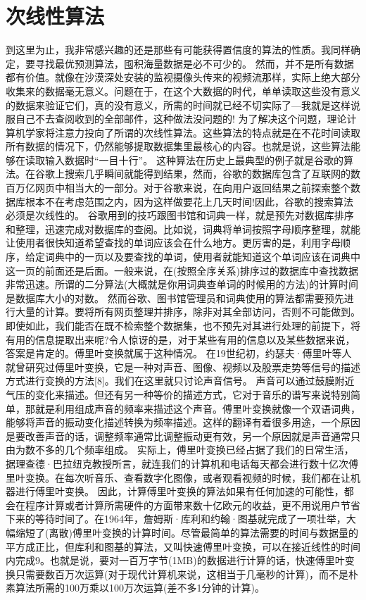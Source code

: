\section{ 次线性算法} 
到这里为止，我非常感兴趣的还是那些有可能获得置信度的算法的性质。我同样确定，要寻找最优预测算法，囤积海量数据是必不可少的。
然而，并不是所有数据都有价值。就像在沙漠深处安装的监视摄像头传来的视频流那样，实际上绝大部分收集来的数据毫无意义。问题在于，在这个大数据的时代，单单读取这些没有意义的数据来验证它们，真的没有意义，所需的时间就已经不切实际了---我就是这样说服自己不去查阅收到的全部邮件，这种做法没问题的!
为了解决这个问题，理论计算机学家将注意力投向了所谓的次线性算法。这些算法的特点就是在不花时间读取所有数据的情况下，仍然能够提取数据集里最核心的内容。也就是说，这些算法能够在读取输入数据时“一目十行”。
这种算法在历史上最典型的例子就是谷歌的算法。在谷歌上搜索几乎瞬间就能得到结果，然而，谷歌的数据库包含了互联网的数百万亿网页中相当大的一部分。对于谷歌来说，在向用户返回结果之前探索整个数据库根本不在考虑范围之内，因为这样做要花上几天时间!因此，谷歌的搜索算法必须是次线性的。
谷歌用到的技巧跟图书馆和词典一样，就是预先对数据库排序和整理，迅速完成对数据库的查阅。比如说，词典将单词按照字母顺序整理，就能让使用者很快知道希望查找的单词应该会在什么地方。更厉害的是，利用字母顺序，给定词典中的一页以及要查找的单词，使用者就能知道这个单词应该在词典中这一页的前面还是后面。一般来说，在(按照全序关系)排序过的数据库中查找数据非常迅速。所谓的二分算法(大概就是你用词典查单词的时候用的方法)的计算时间是数据库大小的对数。
然而谷歌、图书馆管理员和词典使用的算法都需要预先进行大量的计算。要将所有网页整理并排序，除非对其全部访问，否则不可能做到。即使如此，我们能否在既不检索整个数据集，也不预先对其进行处理的前提下，将有用的信息提取出来呢?令人惊讶的是，对于某些有用的信息以及某些数据来说，答案是肯定的。傅里叶变换就属于这种情况。
在19世纪初，约瑟夫·傅里叶等人就曾研究过傅里叶变换，它是一种对声音、图像、视频以及股票走势等信号的描述方式进行变换的方法[8]。我们在这里就只讨论声音信号。
声音可以通过鼓膜附近气压的变化来描述。但还有另一种等价的描述方式，它对于音乐的谱写来说特别简单，那就是利用组成声音的频率来描述这个声音。傅里叶变换就像一个双语词典，能够将声音的振动变化描述转换为频率描述。这样的翻译有着很多用途，一个原因是要改善声音的话，调整频率通常比调整振动更有效，另一个原因就是声音通常只由为数不多的几个频率组成。
实际上，傅里叶变换已经占据了我们的日常生活，据理查德·巴拉纽克教授所言，就连我们的计算机和电话每天都会进行数十亿次傅里叶变换。在每次听音乐、查看数字化图像，或者观看视频的时候，我们都在让机器进行傅里叶变换。
因此，计算傅里叶变换的算法如果有任何加速的可能性，都会在程序计算或者计算所需硬件的方面带来数十亿欧元的收益，更不用说用户节省下来的等待时间了。在1964年，詹姆斯·库利和约翰·图基就完成了一项壮举，大幅缩短了(离散)傅里叶变换的计算时间。尽管最简单的算法需要的时间与数据量的平方成正比，但库利和图基的算法，又叫快速傅里叶变换，可以在接近线性的时间内完成9。也就是说，要对一百万字节(1MB)的数据进行计算的话，快速傅里叶变换只需要数百万次运算(对于现代计算机来说，这相当于几毫秒的计算)，而不是朴素算法所需的100万乘以100万次运算(差不多1分钟的计算)。
